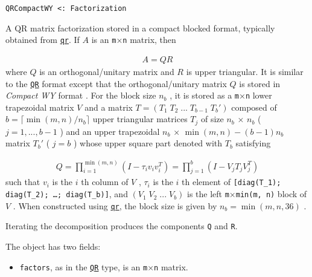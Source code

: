 \begin{adjustwidth}{2em}{0pt}


\begin{verbatim}
QRCompactWY <: Factorization
\end{verbatim}

A QR matrix factorization stored in a compact blocked format, typically obtained from \hyperlink{4122539696772350360}{\texttt{qr}}. If  \(A\)  is an \texttt{m}×\texttt{n} matrix, then

\begin{equation*}
\begin{split}A = Q R\end{split}\end{equation*}
where  \(Q\)  is an orthogonal/unitary matrix and  \(R\)  is upper triangular. It is similar to the \hyperlink{16913872014958777367}{\texttt{QR}} format except that the orthogonal/unitary matrix  \(Q\)  is stored in \emph{Compact WY} format \footnotemark[1].  For the block size  \(n_b\) , it is stored as a \texttt{m}×\texttt{n} lower trapezoidal matrix  \(V\)  and a matrix  \(T = (T_1 \; T_2 \; ... \; T_{b-1} \; T_b')\)  composed of  \(b = \lceil \min(m,n) / n_b \rceil\)  upper triangular matrices  \(T_j\)  of size  \(n_b\) × \(n_b\)  ( \(j = 1, ..., b-1\) ) and an upper trapezoidal  \(n_b\) × \(\min(m,n) - (b-1) n_b\)  matrix  \(T_b'\)  ( \(j=b\) ) whose upper square part denoted with  \(T_b\)  satisfying

\begin{equation*}
\begin{split}Q = \prod_{i=1}^{\min(m,n)} (I - \tau_i v_i v_i^T)
= \prod_{j=1}^{b} (I - V_j T_j V_j^T)\end{split}\end{equation*}
such that  \(v_i\)  is the  \(i\) th column of  \(V\) ,  \(\tau_i\)  is the  \(i\) th element of \texttt{[diag(T\_1); diag(T\_2); …; diag(T\_b)]}, and  \((V_1 \; V_2 \; ... \; V_b)\)  is the left \texttt{m}×\texttt{min(m, n)} block of  \(V\) .  When constructed using \hyperlink{4122539696772350360}{\texttt{qr}}, the block size is given by  \(n_b = \min(m, n, 36)\) .

Iterating the decomposition produces the components \texttt{Q} and \texttt{R}.

The object has two fields:

\begin{itemize}
\item \texttt{factors}, as in the \hyperlink{16913872014958777367}{\texttt{QR}} type, is an \texttt{m}×\texttt{n} matrix.


\end{itemize}
\end{adjustwidth}
